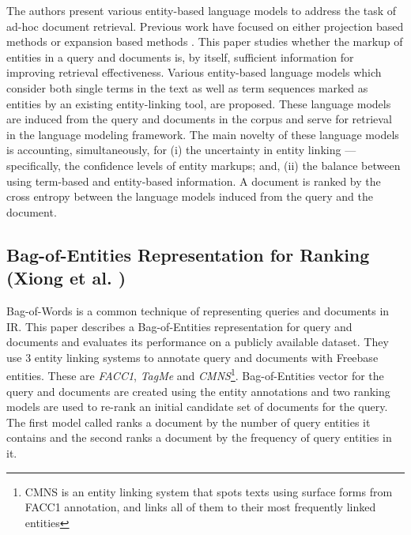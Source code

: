\documentclass{article}
\begin{document}
The authors present various entity-based language models to address the task of ad-hoc document retrieval. Previous work have focused on either projection based methods \cite{liu2015latent} or expansion based methods \cite{xiong2015query}. This paper studies whether the markup of entities in a query and documents is, by itself, sufficient information for improving retrieval effectiveness. Various entity-based language models which consider both single terms in the text as well as term sequences marked as entities by an existing entity-linking tool, are proposed. These language models are induced from the query and documents in the corpus and serve for retrieval in the language modeling framework. The main novelty of these language models is accounting, simultaneously, for (i) the
uncertainty in entity linking — specifically, the confidence levels of entity markups; and, (ii) the balance between using term-based and entity-based information. A document is ranked by the cross entropy between the language models induced from the query and the document.

\subsection{Bag-of-Entities Representation for Ranking (Xiong et al. \cite{xiong2016bag})}
\label{subsec:bag of entities}

Bag-of-Words is a common technique of representing queries and documents in IR. This paper describes a Bag-of-Entities representation for query and documents and evaluates its performance on a publicly available dataset. They use 3 entity linking systems to annotate query and documents with Freebase entities. These are \textit{FACC1}, \textit{TagMe} and \textit{CMNS}\footnote{CMNS is an entity linking system that spots texts using surface forms from FACC1 annotation, and links all of them to their most frequently linked entities}.
Bag-of-Entities vector for the query and documents are created using the entity annotations and two ranking models are used to re-rank an initial candidate set of documents for the query. The first model called ranks a document by the number of query entities it contains and the second ranks a document by the frequency of query entities in it.
\end{document}
